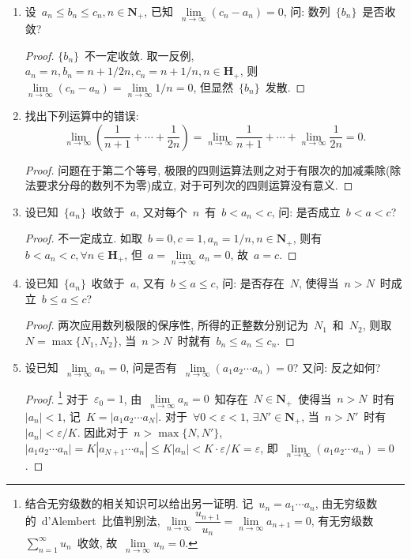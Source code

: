 \documentclass[UTF8,a4paper,11pt,twoside]{book}
\begin{document}
\begin{enumerate}
\begin{proof}
		      $\{a_nb_n\}$~可能发散也可能收敛. 如取~$a_n=b_n=(-1)^n$, 则~$a_nb_n=1$, $\{a_nb_n\}$~收敛; 取~$a_n=(-1)^n, b_n=n$, 则~$a_nb_n=(-1)^n\cdot n$, $\{a_nb_n\}$~发散.\qedhere
	      \end{proof}
	\item 设~$a_n\leqslant b_n\leqslant c_n, n\in\mathbf{N}_{+}$, 已知~$\lim\limits_{n\to\infty} (c_n-a_n)=0$, 问: 数列~$\{b_n\}$~是否收敛?
	      \begin{proof}
		      $\{b_n\}$~不一定收敛. 取一反例, $a_n=n, b_n=n+1/2n, c_n=n+1/n, n\in\mathbf{H}_{+}$, 则~$\lim\limits_{n\to\infty} (c_n-a_n)=\lim\limits_{n\to\infty} 1/n=0$, 但显然~$\{b_n\}$~发散.\qedhere
	      \end{proof}
	\item 找出下列运算中的错误:
	      \[
		      \lim\limits_{n\to\infty} \left(\dfrac{1}{n+1}+\cdots+\dfrac{1}{2n}\right)=\lim\limits_{n\to\infty}\dfrac{1}{n+1}+\cdots+\lim\limits_{n\to\infty}\dfrac{1}{2n}=0.
	      \]
	      \begin{proof}
		      问题在于第二个等号, 极限的四则运算法则之对于有限次的加减乘除(除法要求分母的数列不为零)成立, 对于可列次的四则运算没有意义.\qedhere
	      \end{proof}
	\item 设已知~$\{a_n\}$~收敛于~$a$, 又对每个~$n$~有~$b<a_n<c$, 问: 是否成立~$b<a<c$?
	      \begin{proof}
		      不一定成立. 如取~$b=0, c=1, a_n=1/n, n\in\mathbf{N}_{+}$, 则有~$b<a_n<c, \forall n\in\mathbf{H}_{+}$, 但~$a=\lim\limits_{n\to\infty} a_n=0$, 故~$a=c$.\qedhere
	      \end{proof}
	\item 设已知~$\{a_n\}$~收敛于~$a$, 又有~$b\leqslant a\leqslant c$, 问: 是否存在~$N$, 使得当~$n>N$~时成立~$b\leqslant a\leqslant c$?
	      \begin{proof}
		      两次应用数列极限的保序性, 所得的正整数分别记为~$N_1$~和~$N_2$, 则取~$N=\max\{N_1,N_2\}$, 当~$n>N$~时就有~$b_n\leqslant a_n\leqslant c_n$.\qedhere
	      \end{proof}
	\item 设已知~$\lim\limits_{n\to\infty} a_n=0$, 问是否有~$\lim\limits_{n\to\infty} (a_1a_2\cdots a_n)=0$? 又问: 反之如何?
	      \begin{proof}\footnote{结合无穷级数的相关知识可以给出另一证明. 记~$u_n=a_1\cdots a_n$, 由无穷级数的~d'Alembert~比值判别法, $\lim\limits_{n\to\infty} \dfrac{u_{n+1}}{u_n}=\lim\limits_{n\to\infty} a_{n+1}=0$, 有无穷级数~$\sum\limits_{n=1}^{\infty}u_n$~收敛, 故~$\lim\limits_{n\to\infty} u_n=0$.}
		      对于~$\varepsilon_0=1$, 由~$\lim\limits_{n\to\infty} a_n=0$~知存在~$N\in\mathbf{N}_{+}$~使得当~$n>N$~时有~$|a_n|<1$, 记~$K=|a_1a_2\cdots a_N|$. 对于~$\forall 0<\varepsilon<1$, $\exists N'\in\mathbf{N}_{+}$, 当~$n>N'$~时有~$|a_n|<\varepsilon/K$. 因此对于~$n>\max\{N,N'\}$, $|a_1a_2\cdots a_n|=K|a_{N+1}\cdots a_n|\leqslant K|a_n|<K\cdot\varepsilon/K=\varepsilon$, 即~$\lim\limits_{n\to\infty} (a_1a_2\cdots a_n)=0$.\qedhere
	      \end{proof}
\end{enumerate}
\end{document}
